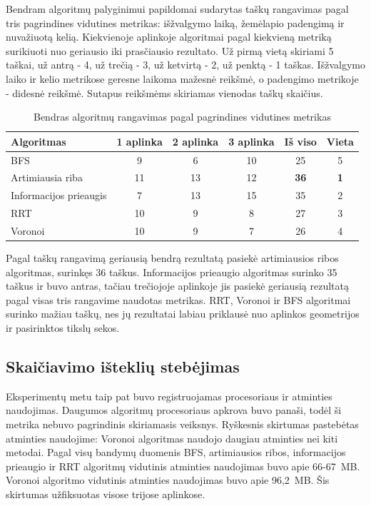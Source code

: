 \documentclass[]{VUMIFTemplateClass}
\begin{document}
Bendram algoritmų palyginimui papildomai sudarytas taškų rangavimas pagal tris pagrindines vidutines metrikas: išžvalgymo laiką, žemėlapio padengimą ir
nuvažiuotą kelią. Kiekvienoje aplinkoje algoritmai pagal kiekvieną metriką surikiuoti nuo geriausio iki prasčiausio rezultato. Už pirmą vietą skiriami 5
taškai, už antrą - 4, už trečią - 3, už ketvirtą - 2, už penktą - 1 taškas. Išžvalgymo laiko ir kelio metrikose geresne laikoma mažesnė reikšmė, o padengimo
metrikoje - didesnė reikšmė. Sutapus reikšmėms skiriamas vienodas taškų skaičius.

\begin{table}[H]
\centering
\caption{Bendras algoritmų rangavimas pagal pagrindines vidutines metrikas}
\label{tab:ranking-summary}
\small
\setlength{\tabcolsep}{4pt}
\begin{tabular}{|l|c|c|c|c|c|}
\hline
\textbf{Algoritmas} & \textbf{1 aplinka} & \textbf{2 aplinka} & \textbf{3 aplinka} & \textbf{Iš viso} & \textbf{Vieta} \\
\hline
BFS & 9 & 6 & 10 & 25 & 5 \\
\hline
Artimiausia riba & 11 & 13 & 12 & \textbf{36} & \textbf{1} \\
\hline
Informacijos prieaugis & 7 & 13 & 15 & 35 & 2 \\
\hline
RRT & 10 & 9 & 8 & 27 & 3 \\
\hline
Voronoi & 10 & 9 & 7 & 26 & 4 \\
\hline
\end{tabular}
\end{table}

Pagal taškų rangavimą geriausią bendrą rezultatą pasiekė artimiausios ribos algoritmas, surinkęs 36 taškus. Informacijos prieaugio algoritmas surinko 35 taškus
ir buvo antras, tačiau trečiojoje aplinkoje jis pasiekė geriausią rezultatą pagal visas tris rangavime naudotas metrikas. RRT, Voronoi ir BFS algoritmai
surinko mažiau taškų, nes jų rezultatai labiau priklausė nuo aplinkos geometrijos ir pasirinktos tikslų sekos.

\subsection{Skaičiavimo išteklių stebėjimas}

Eksperimentų metu taip pat buvo registruojamas procesoriaus ir atminties naudojimas. Daugumos algoritmų procesoriaus apkrova buvo panaši, todėl ši metrika
nebuvo pagrindinis skiriamasis veiksnys. Ryškesnis skirtumas pastebėtas atminties naudojime: Voronoi algoritmas naudojo daugiau atminties nei kiti metodai.
Pagal visų bandymų duomenis BFS, artimiausios ribos, informacijos prieaugio ir RRT algoritmų vidutinis atminties naudojimas buvo apie 66-67~MB. Voronoi
algoritmo vidutinis atminties naudojimas buvo apie 96,2~MB. Šis skirtumas užfiksuotas visose trijose aplinkose.
\end{document}
